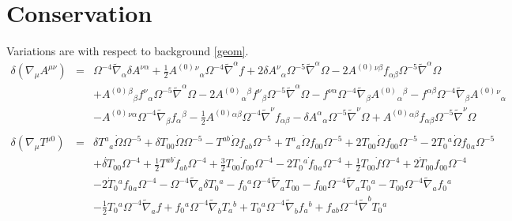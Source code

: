\documentclass[10pt,letterpaper]{article}
\numberwithin{equation}{section}
\begin{document}
\section{Conservation}
Variations are with respect to background \eqref{geom}.
\begin{eqnarray}
\delta(\nabla_\mu A^{\mu\nu})&=& \Omega^{-4} \tilde{\nabla}_{\alpha }\delta A^{\nu \alpha } + \tfrac{1}{2} A^{(0)}{}^{\nu }{}_{\alpha } \Omega^{-4} \tilde{\nabla}^{\alpha }f + 2 \delta A^{\nu }{}_{\alpha } \Omega^{-5} \tilde{\nabla}^{\alpha }\Omega - 2 A^{(0)}{}^{\nu \beta } f_{\alpha \beta } \Omega^{-5} \tilde{\nabla}^{\alpha }\Omega \nonumber \\ 
&& + A^{(0)}{}^{\beta }{}_{\beta } f^{\nu }{}_{\alpha } \Omega^{-5} \tilde{\nabla}^{\alpha }\Omega - 2 A^{(0)}{}_{\alpha }{}^{\beta } f^{\nu }{}_{\beta } \Omega^{-5} \tilde{\nabla}^{\alpha }\Omega -  f^{\nu \alpha } \Omega^{-4} \tilde{\nabla}_{\beta }A^{(0)}{}_{\alpha }{}^{\beta } -  f^{\alpha \beta } \Omega^{-4} \tilde{\nabla}_{\beta }A^{(0)}{}^{\nu }{}_{\alpha } \nonumber \\ 
&& -  A^{(0)}{}^{\nu \alpha } \Omega^{-4} \tilde{\nabla}_{\beta }f_{\alpha }{}^{\beta } -  \tfrac{1}{2} A^{(0)}{}^{\alpha \beta } \Omega^{-4} \tilde{\nabla}^{\nu }f_{\alpha \beta } -  \delta A^{\alpha }{}_{\alpha } \Omega^{-5} \tilde{\nabla}^{\nu }\Omega + A^{(0)}{}^{\alpha \beta } f_{\alpha \beta } \Omega^{-5} \tilde{\nabla}^{\nu }\Omega 
\\ \nonumber\\
\delta(\nabla_\mu T^{\mu 0})&=& \delta T^{a}{}_{a} \dot{\Omega} \Omega^{-5} + \delta T_{00}{} \dot{\Omega} \Omega^{-5} -  T^{ab} \dot{\Omega} f_{ab} \Omega^{-5} + T^{a}{}_{a} \dot{\Omega} f_{00}{} \Omega^{-5} + 2 T_{00}{} \dot{\Omega} f_{00}{} \Omega^{-5} - 2 T_{0}{}^{a} \dot{\Omega} f_{0}{}_{a} \Omega^{-5} \nonumber \\ 
&& + \dot{\delta T}_{00}{} \Omega^{-4} + \tfrac{1}{2} T^{ab} \dot{f}_{ab} \Omega^{-4} + \tfrac{3}{2} T_{00}{} \dot{f}_{00}{} \Omega^{-4} - 2 T_{0}{}^{a} \dot{f}_{0}{}_{a} \Omega^{-4} + \tfrac{1}{2} T_{00}{} \dot{f} \Omega^{-4} + 2 \dot{T}_{00}{} f_{00}{} \Omega^{-4} \nonumber \\ 
&& - 2 \dot{T}_{0}{}^{a} f_{0}{}_{a} \Omega^{-4} -  \Omega^{-4} \tilde{\nabla}_{a}\delta T_{0}{}^{a} -  f_{0}{}^{a} \Omega^{-4} \tilde{\nabla}_{a}T_{00}{} -  f_{00}{} \Omega^{-4} \tilde{\nabla}_{a}T_{0}{}^{a} -  T_{00}{} \Omega^{-4} \tilde{\nabla}_{a}f_{0}{}^{a} \nonumber \\ 
&& -  \tfrac{1}{2} T_{0}{}^{a} \Omega^{-4} \tilde{\nabla}_{a}f + f_{0}{}^{a} \Omega^{-4} \tilde{\nabla}_{b}T_{a}{}^{b} + T_{0}{}^{a} \Omega^{-4} \tilde{\nabla}_{b}f_{a}{}^{b} + f_{ab} \Omega^{-4} \tilde{\nabla}^{b}T_{0}{}^{a}

\end{eqnarray}
\end{document}
